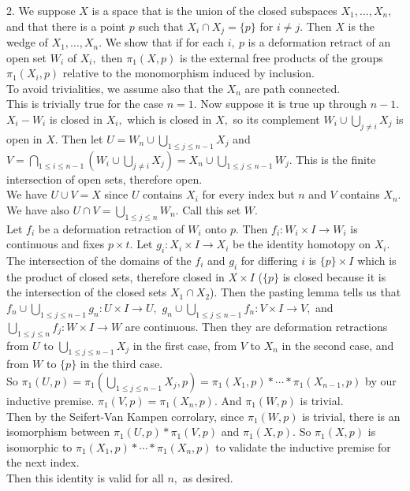 \documentclass{article}
\begin{document}
2. We suppose $X$ is a space that is the union of the closed subspaces $X_1,\ldots, X_n,$ and that there is a point $p$ such that $X_i\cap X_j=\{p\}$ for $i\ne j.$  Then $X$ is the wedge of $X_1,\ldots, X_n.$  We show that if for each $i,\ p$ is a deformation retract of an open set $W_i$ of $X_i,$ then $\pi_1(X,p)$ is the external free products of the groups $\pi_1(X_i,p)$ relative to the monomorphism induced by inclusion.
\\
To avoid trivialities, we assume also that the $X_n$ are path connected.
\\
This is trivially true for the case $n=1.$  Now suppose it is true up through $n-1.$
\\
$X_i-W_i$ is closed in $X_i,$ which is closed in $X,$ so its complement $W_i\cup \bigcup_{j\ne i} X_j$ is open in $X.$  Then let $U=W_n\cup\bigcup_{1\le j\le n-1} X_j$ and $V=\bigcap_{1\le i\le n-1}(W_i\cup \bigcup_{j\ne i} X_j)=X_n\cup\bigcup_{1\le j\le n-1} W_j.$  This is the finite intersection of open sets, therefore open.
\\
We have $U\cup V=X$ since $U$ contains $X_i$ for every index but $n$ and $V$ contains $X_n.$  We have also $U\cap V=\bigcup_{1\le j\le n} W_n.$  Call this set $W.$
\\
Let $f_i$ be a deformation retraction of $W_i$ onto $p.$  Then $f_i:W_i\times I\to W_i$ is continuous and fixes $p\times t.$  Let $g_i:X_i\times I\to X_i$ be the identity homotopy on $X_i.$
\\
The intersection of the domains of the $f_i$ and $g_i$ for differing $i$ is $\{p\}\times I$ which is the product of closed sets, therefore closed in $X\times I$ ($\{p\}$ is closed because it is the intersection of the closed sets $X_1\cap X_2$).  Then the pasting lemma tells us that $f_n\cup\bigcup_{1\le j\le n-1}g_n:U\times I\to U,$ $g_n\cup\bigcup_{1\le j\le n-1}f_n:V\times I\to V,$ and $\bigcup_{1\le j\le n}f_j:W\times I\to W$ are continuous.  Then they are deformation retractions from $U$ to $\bigcup_{1\le j\le n-1} X_j$ in the first case, from $V$ to $X_n$ in the second case, and from $W$ to $\{p\}$ in the third case.
\\
So $\pi_1(U,p)=\pi_1(\bigcup_{1\le j\le n-1} X_j,p)=\pi_1(X_1,p)*\cdots*\pi_1(X_{n-1},p)$ by our inductive premise.  $\pi_1(V,p)=\pi_1(X_n,p).$  And $\pi_1(W,p)$ is trivial.
\\
Then by the Seifert-Van Kampen corrolary, since $\pi_1(W,p)$ is trivial, there is an isomorphism between $\pi_1(U,p)*\pi_1(V,p)$ and $\pi_1(X,p).$  So $\pi_1(X,p)$ is isomorphic to $\pi_1(X_1,p)*\cdots*\pi_1(X_n,p)$ to validate the inductive premise for the next index.
\\
Then this identity is valid for all $n,$ as desired.
\end{document}
